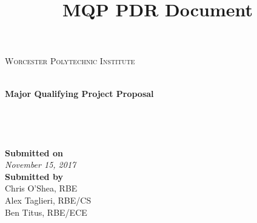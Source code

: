 \documentclass[letterpaper,12pt,titlepage]{article}
\title{MQP PDR Document}
\begin{document}
\begin{titlepage}
\begin{center}
\begin{minipage}{0.4\textwidth}
\end{minipage}
\begin{minipage}{0.5\textwidth}
\centering
\textsc{Worcester Polytechnic Institute}
\end{minipage}
\\ 
\vspace*{1cm}
	\Huge
	\textbf{Major Qualifying Project Proposal}\\
\vspace{1cm}
	\LARGE
	\\
\vspace{2cm}
	\Large
	\text{}\\
    \textbf{}\\
    \textbf{}\\
\vfill
\vspace{0.8cm}
	\LARGE
	\textbf{Submitted on} \\
    \Large
	\textit{November 15, 2017} \\
    
\vspace{0.8cm}
	\LARGE
	\textbf{Submitted by} \\
    \Large
	Chris O'Shea, RBE\\
	\Large
    Alex Taglieri, RBE/CS \\
	\Large
    Ben Titus, RBE/ECE \\
    
\vfill
\end{center}
\end{titlepage}

\newpage
  \tableofcontents
\newpage







% 
% 
% 
\pagebreak
{}

% 
% 

\appendices
% 

\end{document}
